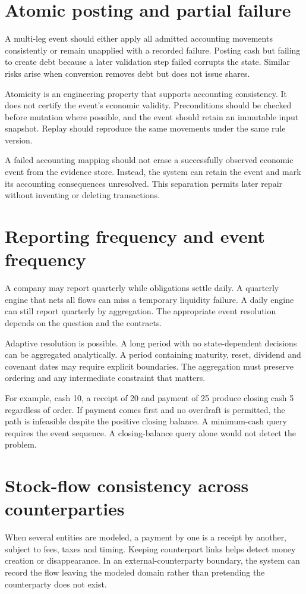 \section{Atomic posting and partial failure}
A multi-leg event should either apply all admitted accounting movements consistently or remain unapplied with a recorded failure. Posting cash but failing to create debt because a later validation step failed corrupts the state. Similar risks arise when conversion removes debt but does not issue shares.

Atomicity is an engineering property that supports accounting consistency. It does not certify the event's economic validity. Preconditions should be checked before mutation where possible, and the event should retain an immutable input snapshot. Replay should reproduce the same movements under the same rule version.

A failed accounting mapping should not erase a successfully observed economic event from the evidence store. Instead, the system can retain the event and mark its accounting consequences unresolved. This separation permits later repair without inventing or deleting transactions.



\section{Reporting frequency and event frequency}
A company may report quarterly while obligations settle daily. A quarterly engine that nets all flows can miss a temporary liquidity failure. A daily engine can still report quarterly by aggregation. The appropriate event resolution depends on the question and the contracts.

Adaptive resolution is possible. A long period with no state-dependent decisions can be aggregated analytically. A period containing maturity, reset, dividend and covenant dates may require explicit boundaries. The aggregation must preserve ordering and any intermediate constraint that matters.

For example, cash 10, a receipt of 20 and payment of 25 produce closing cash 5 regardless of order. If payment comes first and no overdraft is permitted, the path is infeasible despite the positive closing balance. A minimum-cash query requires the event sequence. A closing-balance query alone would not detect the problem.

\section{Stock-flow consistency across counterparties}
When several entities are modeled, a payment by one is a receipt by another, subject to fees, taxes and timing. Keeping counterpart links helps detect money creation or disappearance. In an external-counterparty boundary, the system can record the flow leaving the modeled domain rather than pretending the counterparty does not exist.

